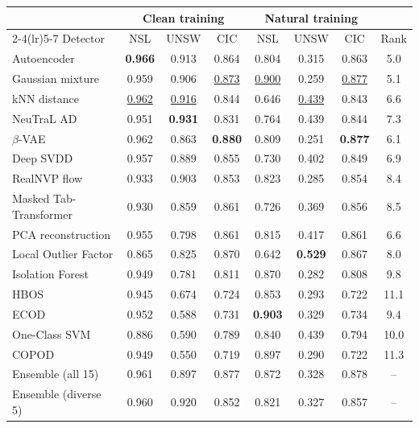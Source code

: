 \begin{tabular}{lccccccc}
\toprule
 & \multicolumn{3}{c}{Clean training} & \multicolumn{3}{c}{Natural training} & \\
\cmidrule(lr){2-4}\cmidrule(lr){5-7}
Detector & NSL & UNSW & CIC & NSL & UNSW & CIC & Rank \\
\midrule
Autoencoder & \textbf{0.966} & 0.913 & 0.864 & 0.804 & 0.315 & 0.863 & 5.0 \\
Gaussian mixture & 0.959 & 0.906 & \underline{0.873} & \underline{0.900} & 0.259 & \underline{0.877} & 5.1 \\
kNN distance & \underline{0.962} & \underline{0.916} & 0.844 & 0.646 & \underline{0.439} & 0.843 & 6.6 \\
NeuTraL AD & 0.951 & \textbf{0.931} & 0.831 & 0.764 & 0.439 & 0.844 & 7.3 \\
$\beta$-VAE & 0.962 & 0.863 & \textbf{0.880} & 0.809 & 0.251 & \textbf{0.877} & 6.1 \\
Deep SVDD & 0.957 & 0.889 & 0.855 & 0.730 & 0.402 & 0.849 & 6.9 \\
RealNVP flow & 0.933 & 0.903 & 0.853 & 0.823 & 0.285 & 0.854 & 8.4 \\
Masked Tab-Transformer & 0.930 & 0.859 & 0.861 & 0.726 & 0.369 & 0.856 & 8.5 \\
PCA reconstruction & 0.955 & 0.798 & 0.861 & 0.815 & 0.417 & 0.861 & 6.6 \\
Local Outlier Factor & 0.865 & 0.825 & 0.870 & 0.642 & \textbf{0.529} & 0.867 & 8.0 \\
Isolation Forest & 0.949 & 0.781 & 0.811 & 0.870 & 0.282 & 0.808 & 9.8 \\
HBOS & 0.945 & 0.674 & 0.724 & 0.853 & 0.293 & 0.722 & 11.1 \\
ECOD & 0.952 & 0.588 & 0.731 & \textbf{0.903} & 0.329 & 0.734 & 9.4 \\
One-Class SVM & 0.886 & 0.590 & 0.789 & 0.840 & 0.439 & 0.794 & 10.0 \\
COPOD & 0.949 & 0.550 & 0.719 & 0.897 & 0.290 & 0.722 & 11.3 \\
\midrule
Ensemble (all 15) & 0.961 & 0.897 & 0.877 & 0.872 & 0.328 & 0.878 & -- \\
Ensemble (diverse 5) & 0.960 & 0.920 & 0.852 & 0.821 & 0.327 & 0.857 & -- \\
\bottomrule
\end{tabular}